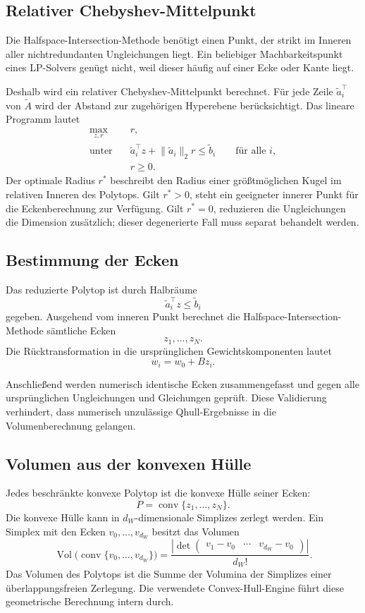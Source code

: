\documentclass[11pt,a4paper]{article}
\newcommand{\Vol}{\operatorname{Vol}}
\newcommand{\conv}{\operatorname{conv}}
\begin{document}
\subsection{Relativer Chebyshev-Mittelpunkt}

Die Halfspace-Intersection-Methode benötigt einen Punkt, der strikt im Inneren
aller nichtredundanten Ungleichungen liegt. Ein beliebiger Machbarkeitspunkt
eines LP-Solvers genügt nicht, weil dieser häufig auf einer Ecke oder Kante
liegt.

Deshalb wird ein relativer Chebyshev-Mittelpunkt berechnet. Für jede Zeile
$\widetilde a_i^\top$ von $\widetilde A$ wird der Abstand zur zugehörigen
Hyperebene berücksichtigt. Das lineare Programm lautet
\begin{align*}
  \max_{z,r}\quad & r,\\
  \text{unter}\quad
  & \widetilde a_i^\top z
    +\lVert\widetilde a_i\rVert_2r
    \leq\widetilde b_i
    \qquad\text{für alle }i,\\
  & r\geq 0.
\end{align*}
Der optimale Radius $r^*$ beschreibt den Radius einer größtmöglichen Kugel im
relativen Inneren des Polytops. Gilt $r^*>0$, steht ein geeigneter innerer
Punkt für die Eckenberechnung zur Verfügung. Gilt $r^*=0$, reduzieren die
Ungleichungen die Dimension zusätzlich; dieser degenerierte Fall muss separat
behandelt werden.

\subsection{Bestimmung der Ecken}

Das reduzierte Polytop ist durch Halbräume
\[
  \widetilde a_i^\top z\leq\widetilde b_i
\]
gegeben. Ausgehend vom inneren Punkt berechnet die
Halfspace-Intersection-Methode sämtliche Ecken
\[
  z_1,\dots,z_N.
\]
Die Rücktransformation in die ursprünglichen Gewichtskomponenten lautet
\[
  w_i=w_0+Bz_i.
\]

Anschließend werden numerisch identische Ecken zusammengefasst und gegen alle
ursprünglichen Ungleichungen und Gleichungen geprüft. Diese Validierung
verhindert, dass numerisch unzulässige Qhull-Ergebnisse in die
Volumenberechnung gelangen.

\subsection{Volumen aus der konvexen Hülle}

Jedes beschränkte konvexe Polytop ist die konvexe Hülle seiner Ecken:
\[
  P=\conv\{z_1,\dots,z_N\}.
\]
Die konvexe Hülle kann in $d_W$-dimensionale Simplizes zerlegt werden. Ein
Simplex mit den Ecken $v_0,\dots,v_{d_W}$ besitzt das Volumen
\[
  \Vol
  \bigl(
    \conv\{v_0,\dots,v_{d_W}\}
  \bigr)
  =
  \frac{
    \left|
      \det
      \begin{pmatrix}
        v_1-v_0 & \cdots & v_{d_W}-v_0
      \end{pmatrix}
    \right|
  }{d_W!}.
\]
Das Volumen des Polytops ist die Summe der Volumina der Simplizes einer
überlappungsfreien Zerlegung. Die verwendete Convex-Hull-Engine führt diese
geometrische Berechnung intern durch.
\end{document}
